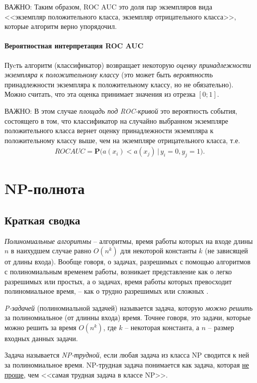 \documentclass[%
	11pt,
	a4paper,
	utf8,
		]{article}
\begin{document}
ВАЖНО: Таким образом, ROC AUC это доля пар экземпляров вида <<экземпляр положительного класса, экземпляр отрицательного класса>>, которые алгоритм верно упорядочил.

\paragraph{Вероятностная интерпретация ROC AUC} Пуcть алгоритм (классификатор) возвращает некоторую \emph{оценку принадлежности экземпляра к положительному классу} (это может быть \emph{вероятность} принадлежности экземпляра к положительному классу, но не обязательно). Можно считать, что эта оценка принимает значения из отрезка $ [0;1] $.

ВАЖНО: В этом случае \emph{площадь под ROC-кривой} это вероятность события, состоящего в том, что классификатор на случайно выбранном экземпляре положительного класса вернет оценку принадлежности экземпляра к положительному классу выше, чем на экземпляре отрицательного класса, т.е.
\begin{align*}
	ROC AUC = \mathbf{P} \Big( a(x_i) < a(x_j) \, | \, y_i = 0, y_j = 1\Big).
\end{align*}


\section{NP-полнота}

\subsection{Краткая сводка}

\emph{Полиномиальные алгоритмы} -- алгоритмы, время работы которых на входе длины $ n $ в наихудшем случае равно $ O(n^k) $ для некоторой константы $ k $ (не зависящей от длины входа). Вообще говоря, о задачах, разрешимых с помощью алгоритмов с полиномиальным временем работы, возникает представление как о легко разрешимых или простых, а о задачах, время работы которых превосходит полиномиальное время, -- как о трудно разрешимых или сложных \cite[1096]{cormen-algo:2013}.

\emph{P-задачей} (полиномиальной задачей) называется задача, которую \emph{можно решить} за полиномиальное (от длинны входа) время. Точнее говоря, это задачи, которые можно решить за время $ O(n^k) $, где $ k $ -- некоторая константа, а $ n $ -- размер входных данных задачи.

Задача называется \emph{NP-трудной}, если любая задача из класса NP сводится к ней за полиномиальное время. NP-трудная задача понимается как задача, которая \underline{не проще}, чем <<самая трудная задача в классе NP>>.
\end{document}
